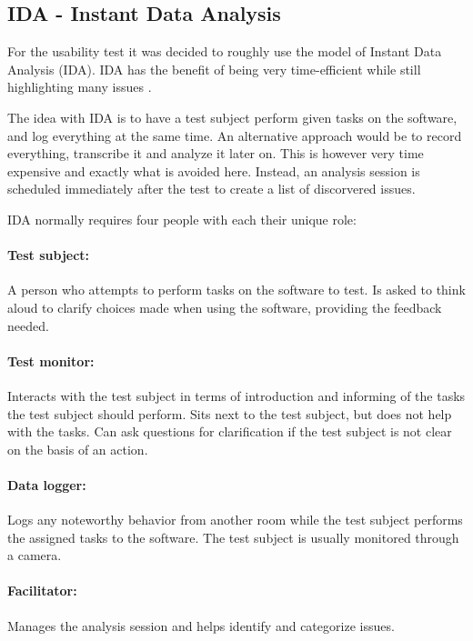 \subsection{IDA - Instant Data Analysis}\label{subsec:IDA}
For the usability test it was decided to roughly use the model of Instant Data Analysis (IDA). IDA has the benefit of being very time-efficient while still highlighting many issues \cite{IDA}.

The idea with IDA is to have a test subject perform given tasks on the software, and log everything at the same time. An alternative approach would be to record everything, transcribe it and analyze it later on. This is however very time expensive and exactly what is avoided here.
Instead, an analysis session is scheduled immediately after the test to create a list of discorvered issues.

IDA normally requires four people with each their unique role:

\paragraph{Test subject:} A person who attempts to perform tasks on the software to test. Is asked to think aloud to clarify choices made when using the software, providing the feedback needed.

\paragraph{Test monitor:} Interacts with the test subject in terms of introduction and informing of the tasks the test subject should perform. Sits next to the test subject, but does not help with the tasks. Can ask questions for clarification if the test subject is not clear on the basis of an action.

\paragraph{Data logger:} Logs any noteworthy behavior from another room while the test subject performs the assigned tasks to the software. The test subject is usually monitored through a camera.

\paragraph{Facilitator:} Manages the analysis session and helps identify and categorize issues.
